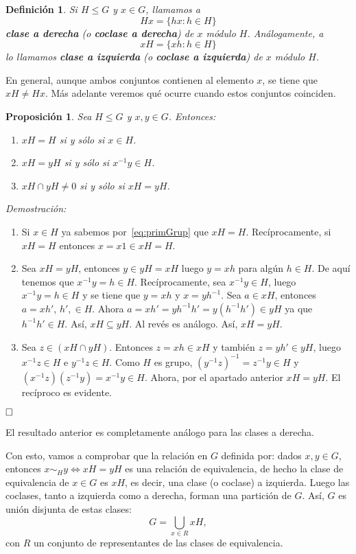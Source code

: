 \documentclass[12pt]{article}
\newtheorem{proposition}[theorem]{Proposición}
\newtheorem{definition}[theorem]{Definición}
\begin{document}
\begin{definition}Si $H \leq G$ y $x \in G$, llamamos a $$Hx = \lbrace hx : h \in H \rbrace$$ \textbf{clase a derecha} (o \textbf{coclase a derecha}) de $x$ módulo $H$. Análogamente, a $$xH = \lbrace xh : h \in H \rbrace$$ lo llamamos \textbf{clase a izquierda} (o \textbf{coclase a izquierda}) de $x$ módulo $H$. 
\end{definition}

En general, aunque ambos conjuntos contienen al elemento $x$, se tiene que $xH \neq Hx$. Más adelante veremos qué ocurre cuando estos conjuntos coinciden.

\begin{proposition}\label{eq:partiGrupo} Sea $H \leq G$ y $x,y \in G$. Entonces: \begin{enumerate}
\item $xH = H$ si y sólo si $x \in H$.
\item $xH = yH$ si y sólo si $x^{-1}y \in H$.
\item $xH \cap yH \neq 0$ si y sólo si $xH = yH$.
\end{enumerate}
\end{proposition}
\emph{Demostración: }\begin{enumerate}
\item Si $x \in H$ ya sabemos por~\ref{eq:primGrup} que $xH = H$. Recíprocamente, si $xH = H$ entonces $x = x1 \in xH = H$.
\item Sea $xH = yH$, entonces $y \in yH = xH$ luego $y = xh$ para algún $h \in H$. De aquí tenemos que $x^{-1}y = h \in H$. Recíprocamente, sea $x^{-1}y \in H$, luego $x^{-1}y = h \in H$ y se tiene que $y = xh$ y $x = yh^{-1}$. Sea $a \in xH$, entonces $a = xh'$, $h' ,\in H$. Ahora $a = xh' = yh^{-1}h' = y(h^{-1}h') \in yH$ ya que $h^{-1}h' \in H$. Así, $xH \subseteq yH$. Al revés es análogo. Así, $xH = yH$.
\item Sea $z \in (xH \cap yH)$. Entonces $z = xh \in xH$ y también $z= yh' \in yH$, luego $x^{-1}z \in H$ e $y^{-1}z \in H$. Como $H$ es grupo, $(y^{-1}z)^{-1} = z^{-1}y \in H$ y $(x^{-1}z)(z^{-1}y) = x^{-1}y \in H$. Ahora, por el apartado anterior $xH = yH$. El recíproco es evidente.
\end{enumerate}

$\hfill \square$

El resultado anterior es completamente análogo para las clases a derecha.

Con esto, vamos a comprobar que la relación en $G$ definida por: dados $x,y \in G$, entonces $x\sim_{H} y \Longleftrightarrow xH = yH$ es una relación de equivalencia, de hecho la clase de equivalencia de $x \in G$ es $xH$, es decir, una clase (o coclase) a izquierda. Luego las coclases, tanto a izquierda como a derecha, forman una partición de $G$. Así, $G$ es unión disjunta de estas clases: $$G = \bigcup_{x \in R} xH,$$ con $R$ un conjunto de representantes de las clases de equivalencia.
\end{document}
